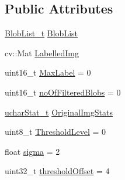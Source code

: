 \subsection*{Public Attributes}
\begin{DoxyCompactItemize}
\item 
\hyperlink{class_vision_1_1_segment_a60e08251e2ab94239e245044c31cde51}{Blob\+List\+\_\+t} \hyperlink{class_vision_1_1_segment_a74e0600a7dd49bd7110ee27bb4cd6e0e}{Blob\+List}
\item 
cv\+::\+Mat \hyperlink{class_vision_1_1_segment_a4daa143f6cd4a753d3bbe45c6a67d27f}{Labelled\+Img}
\item 
uint16\+\_\+t \hyperlink{class_vision_1_1_segment_a22d2a688de65f4d25b164f8b2a03f4a9}{Max\+Label} = 0
\item 
uint16\+\_\+t \hyperlink{class_vision_1_1_segment_a97077da3a144e800073bc06f5d4722d4}{no\+Of\+Filtered\+Blobs} = 0
\item 
\hyperlink{_stats_8h_a5b876b087ada3df30b8dd6309fc25191}{uchar\+Stat\+\_\+t} \hyperlink{class_vision_1_1_segment_ab35cfe5504de7e5ea327991468e6cf3b}{Original\+Img\+Stats}
\item 
uint8\+\_\+t \hyperlink{class_vision_1_1_segment_a44f45a7d08ba6fed38e5c31bc9108291}{Threshold\+Level} = 0
\item 
float \hyperlink{class_vision_1_1_segment_a0d2c607a6064d8d8fea925fc7bfbbc53}{sigma} = 2
\item 
uint32\+\_\+t \hyperlink{class_vision_1_1_segment_a1338fc42ead26c6b1dd661f4281f5674}{threshold\+Offset} = 4
\end{DoxyCompactItemize}
